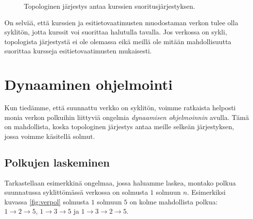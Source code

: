 \begin{figure}
\center
\begin{center}
\end{center}
\caption{Topologinen järjestys antaa kurssien suoritusjärjestyksen.}
\label{fig:kurjar}
\end{figure}

On selvää, että kurssien ja esitietovaatimusten muodostaman
verkon tulee olla syklitön, jotta kurssit voi suorittaa halutulla tavalla.
Jos verkossa on sykli, topologista järjestystä ei ole olemassa
eikä meillä ole mitään mahdollisuutta suorittaa kursseja
esitietovaatimusten mukaisesti.

\section{Dynaaminen ohjelmointi}

Kun tiedämme, että suunnattu verkko on syklitön,
voimme ratkaista helposti monia verkon polkuihin
liittyviä ongelmia \emph{dynaamisen ohjelmoinnin} avulla.
Tämä on mahdollista, koska topologinen järjestys antaa
meille selkeän järjestyksen, jossa voimme käsitellä solmut.

\subsection{Polkujen laskeminen}

Tarkastellaan esimerkkinä ongelmaa, jossa haluamme laskea,
montako polkua suunnatussa syklittömässä
verkossa on solmusta $1$ solmuun $n$.
Esimerkiksi kuvassa \ref{fig:verpol} solmusta $1$ solmuun $5$
on kolme mahdollista polkua:
$1 \rightarrow 2 \rightarrow 5$,
$1 \rightarrow 3 \rightarrow 5$ ja
$1 \rightarrow 3 \rightarrow 2 \rightarrow 5$.


